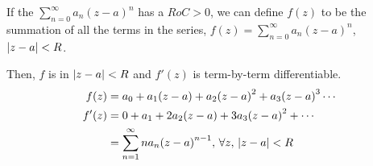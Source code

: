 \begin{theorem}
  If the  $\sum_{n=0}^{\infty} a_{n} {(z-a)}^{n}$ has a  $RoC > 0$, we can define $f(z)$ to be the summation of all the terms in the series, $f(z) = \sum_{n = 0}^{\infty} a_{n} {(z-a)}^{n}$, $\left\lvert z-a \right\rvert < R$.

  Then, $f$ is  in $\left\lvert z-a \right\rvert < R$ and $f'(z)$ is term-by-term differentiable.
  \begin{align*}
    f(z) &= a_{0} + a_{1} (z-a) + a_{2} {(z-a)}^{2} + a_{3} {(z-a)}^{3} \cdots \\
    f'(z) &= 0 + a_{1} + 2 a_{2} (z-a) + 3 a_{3} {(z-a)}^{2} + \cdots \\
         &= \sum_{n=1}^{\infty} n a_{n} {(z-a)}^{n-1}, \, \forall z, \, \left\lvert z-a \right\rvert < R
  \end{align*}
\end{theorem}

